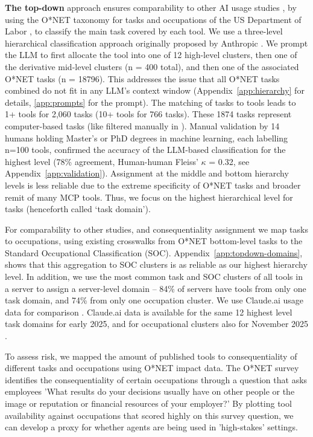 \documentclass[manuscript,screen,nonacm,oneside]{acmart}
\begin{document}
\textbf{The top-down} approach ensures comparability to other AI usage studies \citep{gmyrek2023generative,brynjolfsson2018can,handa2025which,openaiChatGPTRelease}, by using the O*NET taxonomy for tasks and occupations of the US Department of Labor \citep{onetonlineONETOnLine}, to classify the main task covered by each tool. We use a three-level hierarchical classification approach originally proposed by Anthropic \citep[see Appendix][]{handa2025which}. We prompt the LLM to first allocate the tool into one of 12 high-level clusters, then one of the derivative mid-level clusters (n = 400 total), and then one of the associated O*NET tasks (n = 18796). This addresses the issue that all O*NET tasks combined do not fit in any LLM's context window (Appendix~\ref{app:hierarchy} for details, \ref{app:prompts} for the prompt). The matching of tasks to tools leads to 1+ tools for 2,060 tasks (10+ tools for 766 tasks). These 1874 tasks represent computer-based tasks (like filtered manually in \citep{shao2025future}). Manual validation by 14 humans holding Master's or PhD degrees in machine learning, each labelling n=100 tools, confirmed the accuracy of the LLM-based classification for the highest level (78\% agreement, Human-human Fleiss' $\kappa$ = 0.32, see Appendix~\ref{app:validation}). Assignment at the middle and bottom hierarchy levels is less reliable due to the extreme specificity of O*NET tasks and broader remit of many MCP tools. Thus, we focus on the highest hierarchical level for tasks (henceforth called `task domain').

For comparability to other studies, and consequentiality assignment we map tasks to occupations, using existing crosswalks from O*NET bottom-level tasks to the Standard Occupational Classification (SOC). Appendix~\ref{app:topdown-domains}, shows that this aggregation to SOC clusters is as reliable as our highest hierarchy level. In addition, we use the most common task and SOC clusters of all tools in a server to assign a server-level domain -- 84\% of servers have tools from only one task domain, and 74\% from only one occupation cluster. We use Claude.ai usage data for comparison \citep{handa2025which}. Claude.ai data is available for the same 12 highest level task domains for early 2025, and for occupational clusters also for November 2025 \citep{anthropic2026aeiv4}.

To assess risk, we mapped the amount of published tools to consequentiality of different tasks and occupations using O*NET impact data. The O*NET survey \citep{onetonlineWorkContext} identifies the consequentiality of certain occupations through a question that asks employees 'What results do your decisions usually have on other people or the image or reputation or financial resources of your employer?' By plotting tool availability against occupations that scored highly on this survey question, we can develop a proxy for whether agents are being used in 'high-stakes' settings.
\end{document}

